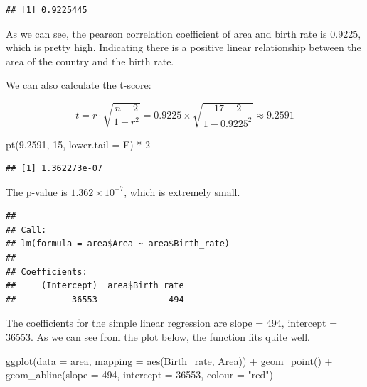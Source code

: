 \documentclass[
]{article}
\newenvironment{Shaded}{\begin{snugshade}}{\end{snugshade}}
\newcommand{\AttributeTok}[1]{\textcolor[rgb]{0.77,0.63,0.00}{#1}}
\newcommand{\DecValTok}[1]{\textcolor[rgb]{0.00,0.00,0.81}{#1}}
\newcommand{\FloatTok}[1]{\textcolor[rgb]{0.00,0.00,0.81}{#1}}
\newcommand{\FunctionTok}[1]{\textcolor[rgb]{0.00,0.00,0.00}{#1}}
\newcommand{\NormalTok}[1]{#1}
\newcommand{\SpecialCharTok}[1]{\textcolor[rgb]{0.00,0.00,0.00}{#1}}
\newcommand{\StringTok}[1]{\textcolor[rgb]{0.31,0.60,0.02}{#1}}
\begin{document}
\begin{verbatim}
## [1] 0.9225445
\end{verbatim}

As we can see, the pearson correlation coefficient of area and birth
rate is 0.9225, which is pretty high. Indicating there is a positive
linear relationship between the area of the country and the birth rate.

We can also calculate the t-score:

\[
t = r \cdot \sqrt{\frac{n - 2}{ 1 - r^2}} = 0.9225 \times \sqrt{\frac{17 - 2}{1 - 0.9225^2}} \approx 9.2591
\]

\begin{Shaded}
\begin{Highlighting}[]
\FunctionTok{pt}\NormalTok{(}\FloatTok{9.2591}\NormalTok{, }\DecValTok{15}\NormalTok{, }\AttributeTok{lower.tail =}\NormalTok{ F) }\SpecialCharTok{*} \DecValTok{2}
\end{Highlighting}
\end{Shaded}

\begin{verbatim}
## [1] 1.362273e-07
\end{verbatim}

The p-value is \(1.362 \times 10^{-7}\), which is extremely small.

\begin{Shaded}
\end{Shaded}

\begin{verbatim}
## 
## Call:
## lm(formula = area$Area ~ area$Birth_rate)
## 
## Coefficients:
##     (Intercept)  area$Birth_rate  
##           36553              494
\end{verbatim}

The coefficients for the simple linear regression are slope = 494,
intercept = 36553. As we can see from the plot below, the function fits
quite well.

\begin{Shaded}
\begin{Highlighting}[]
\FunctionTok{ggplot}\NormalTok{(}\AttributeTok{data =}\NormalTok{ area, }\AttributeTok{mapping =} \FunctionTok{aes}\NormalTok{(Birth\_rate, Area)) }\SpecialCharTok{+} 
  \FunctionTok{geom\_point}\NormalTok{() }\SpecialCharTok{+} 
  \FunctionTok{geom\_abline}\NormalTok{(}\AttributeTok{slope =} \DecValTok{494}\NormalTok{, }\AttributeTok{intercept =} \DecValTok{36553}\NormalTok{, }\AttributeTok{colour =} \StringTok{"red"}\NormalTok{)}
\end{Highlighting}
\end{Shaded}
\end{document}
